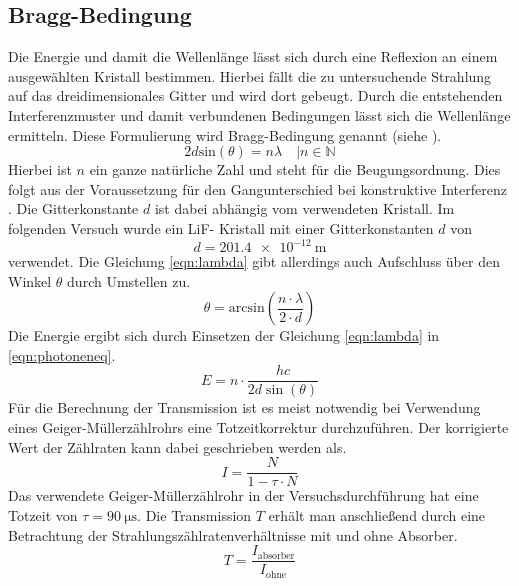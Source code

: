\subsection{Bragg-Bedingung}
Die Energie und damit die Wellenlänge lässt sich durch eine Reflexion an einem ausgewählten Kristall bestimmen. Hierbei fällt die 
zu untersuchende Strahlung auf das dreidimensionales Gitter und wird dort gebeugt. Durch die entstehenden Interferenzmuster und damit verbundenen Bedingungen lässt sich
die Wellenlänge ermitteln. Diese Formulierung wird Bragg-Bedingung genannt (siehe \cite{skript4}).
\begin{equation}
\label{eqn:lambda}
2 d \text{sin}(\theta) =  n \lambda \quad | n \in \mathbb{N}
\end{equation}
Hierbei ist $n$ ein ganze natürliche Zahl und steht für die Beugungsordnung. Dies folgt aus der Voraussetzung für den Gangunterschied bei konstruktive Interferenz
. Die Gitterkonstante $d$ ist dabei abhängig vom verwendeten Kristall.
Im folgenden Versuch wurde ein LiF- Kristall mit einer Gitterkonstanten $d$ von
\begin{equation}
d = \SI{201.4e-12}{\meter}
\end{equation}
verwendet.
Die Gleichung \eqref{eqn:lambda} gibt allerdings auch Aufschluss über den Winkel $\theta$ durch Umstellen zu.
\begin{equation}
\label{eqn:winkelmitlambda}
\theta = \text{arcsin}\left(\frac{n \cdot \lambda}{2 \cdot d}\right)
\end{equation}
Die Energie ergibt sich durch Einsetzen der Gleichung \eqref{eqn:lambda} in \eqref{eqn:photoneneq}.
\begin{equation}
    \label{eqn:braggEnergy}
    E = n \cdot \frac{h c}{2 d \sin (\theta)}
\end{equation}
Für die Berechnung der Transmission ist es meist notwendig bei Verwendung eines Geiger-Müllerzählrohrs eine Totzeitkorrektur durchzuführen.
Der korrigierte Wert der Zählraten kann dabei geschrieben werden als.
\begin{equation}
\label{eqn:totzeit}
I = \frac{N}{1 - \tau \cdot N}
\end{equation}
Das verwendete Geiger-Müllerzählrohr in der Versuchsdurchführung hat eine Totzeit von $\tau = \SI{90}{\micro\second}$.
Die Transmission $T$ erhält man anschließend durch eine Betrachtung der Strahlungszählratenverhältnisse mit und ohne Absorber.
\begin{equation}
\label{eqn:wichtig}
T = \frac{I_{\text{absorber}}}{I_{\text{ohne}}}
\end{equation}

